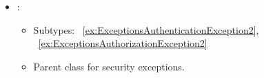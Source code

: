 \begin{itemize}[nolistsep,noitemsep]
\begin{itemize}[noitemsep,nolistsep]
\item[] Thrown if no patient record for the patient with the given identifier exists in the HIS.
\end{itemize}

\item {}: 
\begin{itemize}[noitemsep,nolistsep]
\item[] Subtypes: \iconinher{}~\ref{ex:ExceptionsAuthenticationException2}, \iconinher{}~\ref{ex:ExceptionsAuthorizationException2}
\item[] Parent class for security exceptions.
\end{itemize}

\end{itemize}

